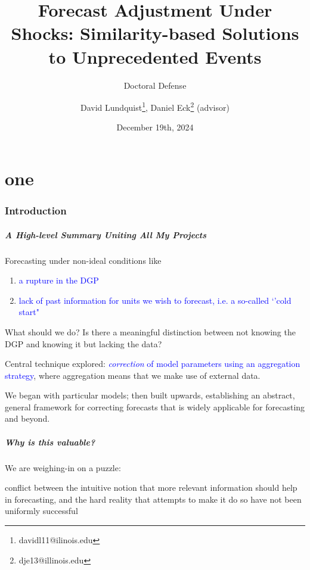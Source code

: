 \documentclass[9pt]{beamer}
\title{Forecast Adjustment Under Shocks: Similarity-based Solutions to Unprecedented Events}
\subtitle{Doctoral Defense}
\author{David Lundquist\thanks{davidl11@ilinois.edu}, Daniel Eck\thanks{dje13@illinois.edu} (advisor)}
\date{December 19th, 2024}
\theoremstyle{definition}
\begin{document}
\part{one}
\begin{frame}
\titlepage
\end{frame}

\section{Introduction}

\begin{frame}
    \frametitle{A High-level Summary Uniting All My Projects}
    
        Forecasting under non-ideal conditions like 

        \begin{enumerate}
            \item \textcolor{blue}{a rupture in the DGP}
            \item  \textcolor{blue}{lack of past information for units we wish to forecast, i.e. a so-called `'cold start"} \parencite[][]{fatemi2023mitigating}
        \end{enumerate}

        \bigskip

        What should we do?  Is there a meaningful distinction between not knowing the DGP and knowing it but lacking the data?

        \bigskip

        Central technique explored: \textcolor{blue}{\textit{correction} of model parameters using an aggregation strategy}, where aggregation means that we make use of external data.


        \bigskip

        We began with particular models; then built upwards, establishing an abstract, general framework for correcting forecasts that is widely applicable for forecasting and beyond.

\end{frame}

    \begin{frame}
        \frametitle{Why is this valuable?}
        
            We are weighing-in on a puzzle:

            \begin{myquote}[colback=red!30, size=small]
                conflict between the intuitive notion that more relevant information should help in forecasting, and the hard reality that attempts to make it do so have not been uniformly successful \parencite[][]{clements2005guest}
            \end{myquote}

    \end{frame}
\end{document}
